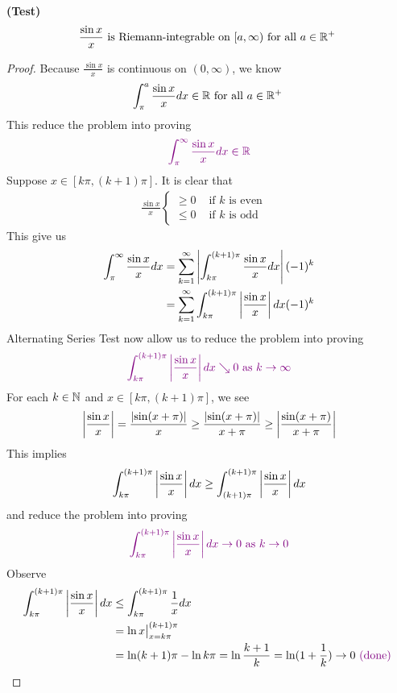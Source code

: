 \documentclass{report}
\begin{document}
\begin{theorem}
\textbf{(Test)} 
\begin{align*}
\frac{\sin x}{x}\text{ is Riemann-integrable on $[a,\infty)$ for all $a\in\mathbb{R}^+$ }
\end{align*}
\end{theorem}
\begin{proof}
Because $\frac{\sin x}{x}$ is continuous on $(0,\infty)$, we know 
\begin{align*}
\int_{\pi}^{a} \frac{\sin x}{x}dx\in\mathbb{R}\text{ for all $a\in\mathbb{R}^+$ }
\end{align*}
This reduce the problem into proving 
\begin{align*}
  \textcolor{violet}{\int_{\pi}^{\infty} \frac{\sin x}{x}dx\in\mathbb{R}}
\end{align*}
Suppose $x\in [k\pi,(k+1)\pi]$. It is clear that 
\begin{align*}
 \frac{\sin x}{x}\begin{cases}
   \geq 0& \text{ if $k\text{ is even  }$ }\\
   \leq 0& \text{ if $k$ is odd }
 \end{cases}
\end{align*}
This give us 
\begin{align*}
\int_{\pi}^{\infty} \frac{\sin x}{x}dx&=\sum_{k=1}^{\infty} \left|\int_{k\pi}^{(k+1)\pi} \frac{\sin x}{x}dx\right|(-1)^k \\
&=\sum_{k=1}^{\infty} \int_{k\pi}^{(k+1)\pi} \left|\frac{\sin x}{x}\right|dx(-1)^k \\
\end{align*}
Alternating Series Test now allow us to reduce the problem into proving 
\begin{align*}
  \textcolor{violet}{\int_{k\pi}^{(k+1)\pi} \left|\frac{\sin x}{x}\right|dx\searrow 0\text{ as }k\to \infty}
\end{align*}
For each $k\in\mathbb{N}$ and $x\in [k\pi,(k+1)\pi]$, we see 
\begin{align*}
 \left| \frac{\sin x}{x}\right|=  \frac{ \left|\sin (x+\pi)\right|}{x}\geq \frac{\left|\sin (x+\pi)\right|}{x+\pi}\geq \left|\frac{\sin (x+\pi)}{x+\pi}\right|
\end{align*}
This implies 
\begin{align*}
\int_{k\pi}^{(k+1)\pi} \left|\frac{\sin x}{x}\right|dx \geq \int_{(k+1)\pi}^{(k+1)\pi} \left|\frac{\sin x}{x}\right|dx
\end{align*}
and reduce the problem into proving 
\begin{align*}
  \textcolor{violet}{\int_{k\pi}^{(k+1)\pi} \left|\frac{\sin x}{x}\right|dx\to 0\text{ as }k\to 0}
\end{align*}
Observe 
\begin{align*}
  \int_{k\pi}^{(k+1)\pi} \left|\frac{\sin x}{x}\right|dx&\leq  \int_{k\pi}^{(k+1)\pi} \frac{1}{x}dx \\
&= \ln x\big|_{x=k\pi}^{(k+1)\pi}\\
&=\ln (k+1)\pi - \ln k\pi = \ln \frac{k+1}{k}= \ln (1+\frac{1}{k})\to 0 \textcolor{violet}{\text{ (done) }}
\end{align*}


\end{proof}
\end{document}
